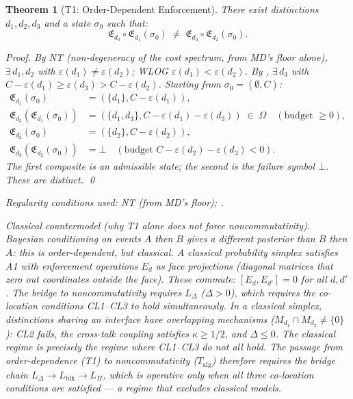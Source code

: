 \documentclass[11pt,a4paper]{article}
\newtheorem{theorem}{Theorem}[section]
\theoremstyle{definition}
\newcommand{\eps}{\varepsilon}
\begin{document}
\begin{theorem}[T1: Order-Dependent Enforcement]\label{thm:T1}
There exist distinctions $d_1, d_2, d_3$ and a state $\sigma_0$ such that:
\[
\mathfrak{E}_{d_3} \circ \mathfrak{E}_{d_1}(\sigma_0) \;\ne\; \mathfrak{E}_{d_3} \circ \mathfrak{E}_{d_2}(\sigma_0).
\]

\noindent\textit{Proof.}  By NT (non-degeneracy of the cost spectrum, from MD's floor alone), $\exists\, d_1, d_2$ with $\eps(d_1) \ne \eps(d_2)$; WLOG $\eps(d_1) < \eps(d_2)$.  By , $\exists\, d_3$ with $C - \eps(d_1) \ge \eps(d_3) > C - \eps(d_2)$.  Starting from $\sigma_0 = (\emptyset, C)$:
\begin{align*}
\mathfrak{E}_{d_1}(\sigma_0) &= (\{d_1\}, C - \eps(d_1)), \\
\mathfrak{E}_{d_3}(\mathfrak{E}_{d_1}(\sigma_0)) &= (\{d_1, d_3\}, C - \eps(d_1) - \eps(d_3)) \;\in\; \Omega \quad (\text{budget $\ge 0$}), \\
\mathfrak{E}_{d_2}(\sigma_0) &= (\{d_2\}, C - \eps(d_2)), \\
\mathfrak{E}_{d_3}(\mathfrak{E}_{d_2}(\sigma_0)) &= \bot \quad (\text{budget } C - \eps(d_2) - \eps(d_3) < 0).
\end{align*}
The first composite is an admissible state; the second is the failure symbol $\bot$.  These are distinct.  \qed

\noindent\textit{Regularity conditions used:} NT (from MD's floor); .

\noindent\textit{Classical countermodel (why T1 alone does not force noncommutativity).}  Bayesian conditioning on events $A$ then $B$ gives a different posterior than $B$ then $A$: this is order-dependent, but classical.  A classical probability simplex satisfies A1 with enforcement operations $E_d$ as face projections (diagonal matrices that zero out coordinates outside the face).  These commute: $[E_d, E_{d'}] = 0$ for all $d, d'$.  The bridge to noncommutativity requires $L_\Delta$ ($\Delta > 0$), which requires the co-location conditions CL1--CL3 to hold simultaneously.  In a classical simplex, distinctions sharing an interface have overlapping mechanisms ($M_{d_1} \cap M_{d_2} \ne \{0\}$): CL2 fails, the cross-talk coupling satisfies $\kappa \ge 1/2$, and $\Delta \le 0$.  The classical regime is precisely the regime where CL1--CL3 do not all hold.  The passage from order-dependence (T1) to noncommutativity ($T_{\mathrm{alg}}$) therefore requires the bridge chain $L_\Delta \to L_{\mathrm{blk}} \to L_\Pi$, which is operative only when all three co-location conditions are satisfied --- a regime that excludes classical models.
\end{theorem}
\end{document}
